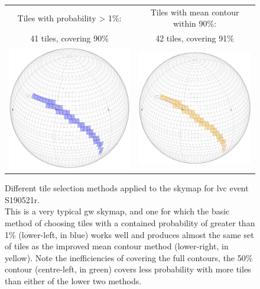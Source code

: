 \begin{colsection}
\begin{colsection}
\begin{figure}[p]
\begin{center}
\begin{tabular}{cc}
\\
Tiles with probability > 1\%: &
Tiles with mean contour within 90\%:
\\
41 tiles, covering 90\% &
42 tiles, covering 91\%
\\
\includegraphics[width=0.25\linewidth]{images/tiling/1_a.png} &
\includegraphics[width=0.25\linewidth]{images/tiling/1_b.png}
\\

\end{tabular}
\end{center}
\caption[Different tile selection methods for S190521r]{Different tile selection methods applied to the skymap for \gls{lvc} event S190521r.\\
This is a very typical \gls{gw} skymap, and one for which the basic method of choosing tiles with a contained probability of greater than 1\% (lower-left, in blue) works well and produces almost the same set of tiles as the improved mean contour method (lower-right, in yellow). Note the inefficiencies of covering the full contours, the 50\% contour (centre-left, in green) covers less probability with more tiles than either of the lower two methods.
}
\label{fig:tiling_S190521r}
\end{figure}



\end{colsection}
\end{colsection}
